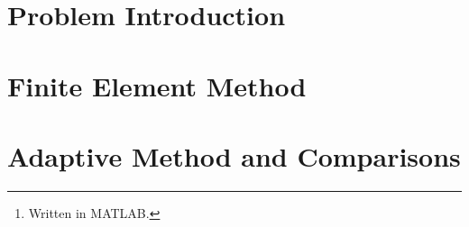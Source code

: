 \documentclass[12pt]{article}
\title{\reporttitle}
\author{Andrea Di Antonio, 858798 \\ \hyperlink{mailto:a.diantonio1@campus.unimib.it}{a.diantonio1@campus.unimib.it}}
\date{Exam session of July 27, 2023 \\ Academic Year 2022-23}
\newcommand{\reporttitle}{Adaptive 1D 1st-order Lagrange FEM}
\begin{document}
	\maketitle
	\thispagestyle{fancy}

	\begin{abstract}
		\begin{center}
            Report for the course \textit{Metodi Numerici per Equazioni alle Derivate Parziali} on the definition and costruction of an \textit{\reporttitle}\footnote{Written in MATLAB.} and a subsequent analysis which includes a comparison against a more naive approach by considering a sequence of uniformly refined meshes.
        \end{center}
	\end{abstract}

    \tableofcontents

    \newpage
    \section{Problem Introduction}
    

    \newpage
    \section{Finite Element Method}
    

    \newpage
    \section{Adaptive Method and Comparisons}
\end{document}
